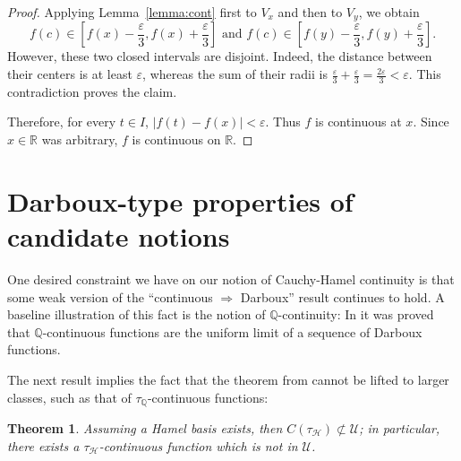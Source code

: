 \documentclass[11pt]{amsart} %
\newtheorem{theorem}{Theorem}[section]
\theoremstyle{definition}
\newcommand{\Q}{\mathbb{Q}}
\newcommand{\AD}{\mathcal{H}}
\begin{document}
\begin{proof}
Applying Lemma~\ref{lemma:cont} first to $V_x$ and then to $V_y$, we obtain
\begin{equation} 
    f(c)\in
    \left[f(x)-\frac{\varepsilon}{3},
          f(x)+\frac{\varepsilon}{3}\right]\mbox{ and } 
    f(c)\in
    \left[f(y)-\frac{\varepsilon}{3},
          f(y)+\frac{\varepsilon}{3}\right].
\end{equation}  
However, these two closed intervals are disjoint. Indeed, the distance
between their centers is at least $\varepsilon$, whereas the sum of their
radii is $
    \frac{\varepsilon}{3}+\frac{\varepsilon}{3}
    =\frac{2\varepsilon}{3}<\varepsilon.$
This contradiction proves the claim.

Therefore, for every $t\in I$, $|f(t)-f(x)|<\varepsilon.$
Thus $f$ is continuous at $x$. Since $x\in\mathbb{R}$ was arbitrary,
$f$ is continuous on $\mathbb{R}$.
\end{proof}





\section{Darboux-type properties of candidate notions}

One desired constraint we have on our notion of Cauchy-Hamel continuity is that some weak version of the ``continuous $\Rightarrow$ Darboux'' result continues to hold. A baseline illustration of this fact is the notion of $\mathbb{Q}$-continuity: In \cite{10} it was proved that $\mathbb{Q}$-continuous functions are the uniform limit of a sequence of Darboux functions. 

The next result implies the fact that the theorem from \cite{10} cannot be lifted to larger classes, such as that of $\tau_{\Q}$-continuous functions:


\begin{theorem}%
\label{prop:6.4}
Assuming a Hamel basis exists, then 
$C(\tau_{\AD})\not\subset \mathcal{U}$; in particular, there exists a $\tau_{\AD}$-continuous function which is not in $\mathcal{U}$.
\end{theorem}
\end{document}
